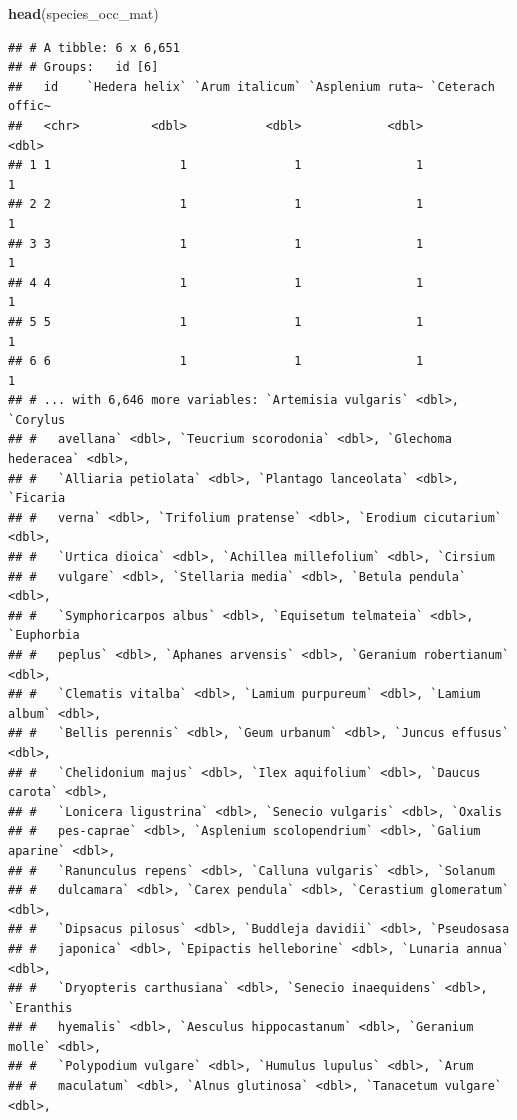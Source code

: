\documentclass[
]{book}
\newenvironment{Shaded}{\begin{snugshade}}{\end{snugshade}}
\newcommand{\KeywordTok}[1]{\textcolor[rgb]{0.13,0.29,0.53}{\textbf{#1}}}
\newcommand{\NormalTok}[1]{#1}
\begin{document}
\begin{Shaded}
\begin{Highlighting}[]
\KeywordTok{head}\NormalTok{(species_occ_mat)}
\end{Highlighting}
\end{Shaded}

\begin{verbatim}
## # A tibble: 6 x 6,651
## # Groups:   id [6]
##   id    `Hedera helix` `Arum italicum` `Asplenium ruta~ `Ceterach offic~
##   <chr>          <dbl>           <dbl>            <dbl>            <dbl>
## 1 1                  1               1                1                1
## 2 2                  1               1                1                1
## 3 3                  1               1                1                1
## 4 4                  1               1                1                1
## 5 5                  1               1                1                1
## 6 6                  1               1                1                1
## # ... with 6,646 more variables: `Artemisia vulgaris` <dbl>, `Corylus
## #   avellana` <dbl>, `Teucrium scorodonia` <dbl>, `Glechoma hederacea` <dbl>,
## #   `Alliaria petiolata` <dbl>, `Plantago lanceolata` <dbl>, `Ficaria
## #   verna` <dbl>, `Trifolium pratense` <dbl>, `Erodium cicutarium` <dbl>,
## #   `Urtica dioica` <dbl>, `Achillea millefolium` <dbl>, `Cirsium
## #   vulgare` <dbl>, `Stellaria media` <dbl>, `Betula pendula` <dbl>,
## #   `Symphoricarpos albus` <dbl>, `Equisetum telmateia` <dbl>, `Euphorbia
## #   peplus` <dbl>, `Aphanes arvensis` <dbl>, `Geranium robertianum` <dbl>,
## #   `Clematis vitalba` <dbl>, `Lamium purpureum` <dbl>, `Lamium album` <dbl>,
## #   `Bellis perennis` <dbl>, `Geum urbanum` <dbl>, `Juncus effusus` <dbl>,
## #   `Chelidonium majus` <dbl>, `Ilex aquifolium` <dbl>, `Daucus carota` <dbl>,
## #   `Lonicera ligustrina` <dbl>, `Senecio vulgaris` <dbl>, `Oxalis
## #   pes-caprae` <dbl>, `Asplenium scolopendrium` <dbl>, `Galium aparine` <dbl>,
## #   `Ranunculus repens` <dbl>, `Calluna vulgaris` <dbl>, `Solanum
## #   dulcamara` <dbl>, `Carex pendula` <dbl>, `Cerastium glomeratum` <dbl>,
## #   `Dipsacus pilosus` <dbl>, `Buddleja davidii` <dbl>, `Pseudosasa
## #   japonica` <dbl>, `Epipactis helleborine` <dbl>, `Lunaria annua` <dbl>,
## #   `Dryopteris carthusiana` <dbl>, `Senecio inaequidens` <dbl>, `Eranthis
## #   hyemalis` <dbl>, `Aesculus hippocastanum` <dbl>, `Geranium molle` <dbl>,
## #   `Polypodium vulgare` <dbl>, `Humulus lupulus` <dbl>, `Arum
## #   maculatum` <dbl>, `Alnus glutinosa` <dbl>, `Tanacetum vulgare` <dbl>,

\end{verbatim}
\end{document}
